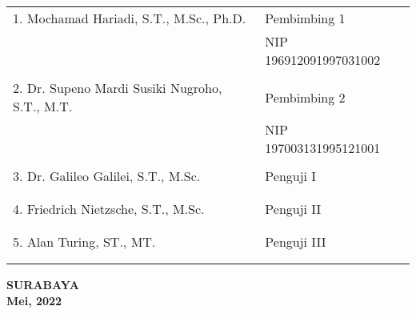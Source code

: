     \noindent
    \begin{tabularx}{\textwidth}{X l}
      1. Mochamad Hariadi, S.T., M.Sc., Ph.D.          & Pembimbing 1 \\
      &  NIP 196912091997031002\\
      &  \\
      2. Dr. Supeno Mardi Susiki Nugroho, S.T., M.T.     & Pembimbing 2 \\
      &  NIP 197003131995121001\\
      &  \\
      3. Dr. Galileo Galilei, S.T., M.Sc.  & Penguji I \\
      &  \\
      &  \\
      4. Friedrich Nietzsche, S.T., M.Sc.  & Penguji II \\
      &  \\
      &  \\
      5. Alan Turing, ST., MT.             & Penguji III \\
      &  \\
      &  \\
    \end{tabularx}
  \endgroup

  \vspace{12ex}




  \begin{center}
    \textbf{SURABAYA\\Mei, 2022}
  \end{center}
\endgroup
